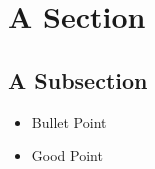 \documentclass{beamer}
\begin{document}
\section{A Section}
\subsection{A Subsection}
\begin{frame}

\begin{itemize}
	\item Bullet Point
	\item Good Point
\end{itemize}
  
\end{frame} 


\end{document}
